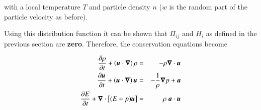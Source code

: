 \noindent with a local temperature $T$ and particle density $n$ ($w$ is the random part of the particle velocity as before).

Using this distribution function it can be shown that $\Pi_{ij}$ and
$H_i$ as defined in the previous section are {\bf zero}. Therefore, the conservation equations become


\begin{eqnarray}
  \ptderiv{\rho}  + \left(\v{u}\cdot \del\right)\rho  &=& -\rho \del \cdot \v{u}   \\
\ptderiv{\v{u}} +  \left(\v{u}\cdot \del\right) \v{u} &=& -\frac{1}{\rho} \grad{p}  + \v{a} \\
\ptderiv{E} + \del \cdot \left[ (E+p) \v{u} \right] &=& \rho \ \v{a}\cdot\v{u}  
\end{eqnarray}